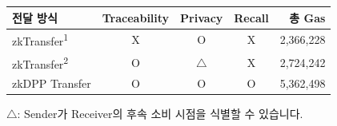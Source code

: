 \begin{center}\small\begin{tabular}{@{}lcccr@{}}\toprule
        \textbf{전달 방식}                & \textbf{Traceability} & \textbf{Privacy} & \textbf{Recall} & \textbf{총 Gas} \\
        \midrule
        zkTransfer\textsuperscript{1} & X                     & O                & X               & 2,366,228      \\
        zkTransfer\textsuperscript{2} & O                     & $\triangle$      & X               & 2,724,242      \\
        zkDPP Transfer                & O                     & O                & O               & 5,362,498      \\
        \bottomrule\end{tabular}\par\smallskip
    $\triangle$: Sender가 Receiver의 후속 소비 시점을 식별할 수 있습니다.
\end{center}

